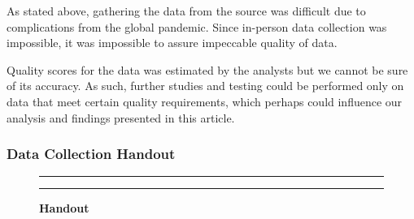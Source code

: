 \documentclass[]{article}
\begin{document}
As stated above, gathering the data from the source was difficult due to
complications from the global pandemic. Since in-person data collection
was impossible, it was impossible to assure impeccable quality of data.

Quality scores for the data was estimated by the analysts but we cannot
be sure of its accuracy. As such, further studies and testing could be
performed only on data that meet certain quality requirements, which
perhaps could influence our analysis and findings presented in this
article.

\newpage
\subsubsection{Data Collection Handout}
\label{sec:appendix-data-handout}

\begin{figure}[!ht]
    \hrule
    \caption{ \textbf{Handout} }
    \begin{center}
    \end{center}
    \label{fig:handout}
    \hrule
\end{figure}
\end{document}
